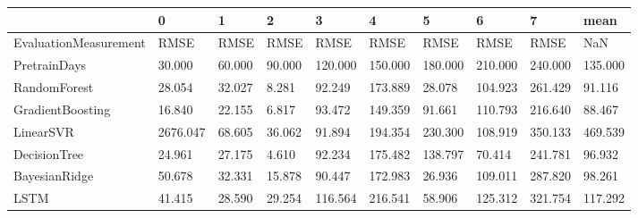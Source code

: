 \begin{tabular}{llllllllll}
\toprule
{} &        0 &      1 &      2 &       3 &       4 &       5 &       6 &       7 &    mean \\
\midrule
EvaluationMeasurement &     RMSE &   RMSE &   RMSE &    RMSE &    RMSE &    RMSE &    RMSE &    RMSE &     NaN \\
PretrainDays          &   30.000 & 60.000 & 90.000 & 120.000 & 150.000 & 180.000 & 210.000 & 240.000 & 135.000 \\
RandomForest          &   28.054 & 32.027 &  8.281 &  92.249 & 173.889 &  28.078 & 104.923 & 261.429 &  91.116 \\
GradientBoosting      &   16.840 & 22.155 &  6.817 &  93.472 & 149.359 &  91.661 & 110.793 & 216.640 &  88.467 \\
LinearSVR             & 2676.047 & 68.605 & 36.062 &  91.894 & 194.354 & 230.300 & 108.919 & 350.133 & 469.539 \\
DecisionTree          &   24.961 & 27.175 &  4.610 &  92.234 & 175.482 & 138.797 &  70.414 & 241.781 &  96.932 \\
BayesianRidge         &   50.678 & 32.331 & 15.878 &  90.447 & 172.983 &  26.936 & 109.011 & 287.820 &  98.261 \\
LSTM                  &   41.415 & 28.590 & 29.254 & 116.564 & 216.541 &  58.906 & 125.312 & 321.754 & 117.292 \\
\bottomrule
\end{tabular}
